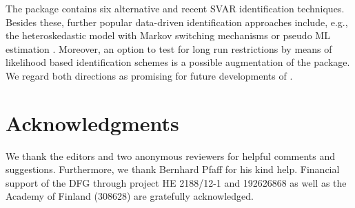 \documentclass[nojss]{jss}\usepackage[]{graphicx}\usepackage[]{color}
\begin{document}
The  package contains six alternative and recent SVAR identification techniques. Besides these, further popular data-driven identification approaches include, e.g., the heteroskedastic model with Markov switching mechanisms \citep{LanneLuetMac2010, HerwartzLuetkepohl2014} or pseudo ML estimation \citep{PML}. Moreover, an option to test for long run restrictions by means of likelihood based identification schemes is a possible augmentation of the package. We regard both directions as promising for future developments of .


%


\section*{Acknowledgments}

We thank the editors and two anonymous reviewers for helpful comments and suggestions. Furthermore, we thank Bernhard Pfaff for his kind help. Financial support of the DFG through project HE 2188/12-1 and 192626868 as well as the Academy of Finland (308628) are gratefully acknowledged.


%









\end{document}
